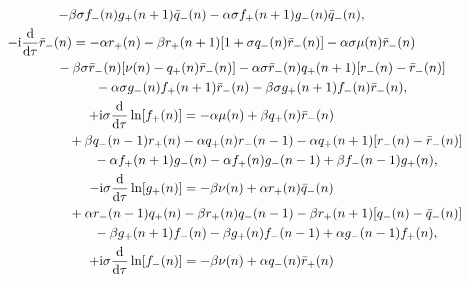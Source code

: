 \documentclass[pdftex]{sigma}
\numberwithin{equation}{section}
\begin{document}
\begin{gather}
	 -\beta\sigma f_{-}(n)g_{+}(n+1)\bar{q}_{-}(n) -\alpha\sigma f_{+}(n+1)g_{-}(n)\bar{q}_{-}(n), \label{eq-6.7}
\\
	 -\mathrm{i}\frac{\mathrm{d}}{\mathrm{d}\tau}\bar{r}_{-}(n) = -\alpha r_{+}(n) - \beta r_{+}(n+1)[1+\sigma q_{-}(n)\bar{r}_{-}(n)] - \alpha\sigma\mu(n)\bar{r}_{-}(n)\nonumber\\
 \hspace{0.25mm}\hphantom{-\mathrm{i}\frac{\mathrm{d}}{\mathrm{d}\tau}\bar{r}_{-}(n) =}{}
	 -\beta\sigma \bar{r}_{-}(n)[\nu(n)-q_{+}(n)\bar{r}_{-}(n)] - \alpha\sigma \bar{r}_{-}(n)q_{+}(n+1)[r_{-}(n)-\bar{r}_{-}(n)]\nonumber\\
 \hspace{0.25mm}\hphantom{-\mathrm{i}\frac{\mathrm{d}}{\mathrm{d}\tau}\bar{r}_{-}(n) =}{}
	 -\alpha\sigma g_{-}(n)f_{+}(n+1)\bar{r}_{-}(n) -\beta\sigma g_{+}(n+1)f_{-}(n)\bar{r}_{-}(n), \label{eq-6.8}
\\
	 +\mathrm{i}\sigma\frac{\mathrm{d}}{\mathrm{d}\tau}\ln[f_{+}(n)] = -\alpha \mu(n) + \beta q_{+}(n)\bar{r}_{-}(n)\nonumber\\
 \hspace{0.25mm}\hphantom{+\mathrm{i}\sigma\frac{\mathrm{d}}{\mathrm{d}\tau}\ln[f_{+}(n)] =}{}
	 + \beta q_{-}(n-1)r_{+}(n) - \alpha q_{+}(n)r_{-}(n-1) - \alpha q_{+}(n+1)[r_{-}(n)-\bar{r}_{-}(n)]\nonumber\\
 \hspace{0.25mm}\hphantom{+\mathrm{i}\sigma\frac{\mathrm{d}}{\mathrm{d}\tau}\ln[f_{+}(n)] =}{}
	 - \alpha f_{+}(n+1)g_{-}(n) - \alpha f_{+}(n)g_{-}(n-1) + \beta f_{-}(n-1)g_{+}(n), \label{eq-6.9}
\\
	 -\mathrm{i}\sigma\frac{\mathrm{d}}{\mathrm{d}\tau}\ln[g_{+}(n)] = -\beta \nu(n) + \alpha r_{+}(n)\bar{q}_{-}(n)\nonumber\\
 \hspace{0.25mm}\hphantom{-\mathrm{i}\sigma\frac{\mathrm{d}}{\mathrm{d}\tau}\ln[g_{+}(n)] =}{}
	 + \alpha r_{-}(n-1)q_{+}(n) - \beta r_{+}(n)q_{-}(n-1) - \beta r_{+}(n+1)[q_{-}(n)-\bar{q}_{-}(n)]\nonumber\\
 \hspace{0.25mm}\hphantom{-\mathrm{i}\sigma\frac{\mathrm{d}}{\mathrm{d}\tau}\ln[g_{+}(n)] =}{}
	 - \beta g_{+}(n+1)f_{-}(n) - \beta g_{+}(n)f_{-}(n-1) + \alpha g_{-}(n-1)f_{+}(n), \label{eq-6.10}
\\
	 +\mathrm{i}\sigma\frac{\mathrm{d}}{\mathrm{d}\tau}\ln[f_{-}(n)] = -\beta \nu(n) + \alpha q_{-}(n)\bar{r}_{+}(n)\nonumber\\
 \hspace{0.25mm}\hphantom{+\mathrm{i}\sigma\frac{\mathrm{d}}{\mathrm{d}\tau}\ln[f_{-}(n)] =}{}

\end{gather}
\end{document}
